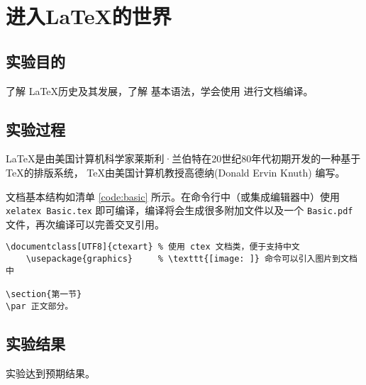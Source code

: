 \section{进入\LaTeX 的世界}

\subsection{实验目的}
\par 了解 \LaTeX 历史及其发展，了解 \LaTeXe 基本语法，学会使用 \XeLaTeX 进行文档编译。

\subsection{实验过程}
\par \LaTeX 是由美国计算机科学家莱斯利·兰伯特在20世纪80年代初期开发的一种基于 \TeX 的排版系统，
\TeX 由美国计算机教授高德纳(Donald Ervin Knuth) 编写。

\par 文档基本结构如清单 \ref{code:basic} 所示。在命令行中（或集成编辑器中）使用
\texttt{xelatex Basic.tex}
即可编译，编译将会生成很多附加文件以及一个 \verb|Basic.pdf| 文件，再次编译可以完善交叉引用。

\begin{code}
\label{code:basic}
\begin{verbatim}
\documentclass[UTF8]{ctexart} % 使用 ctex 文档类，便于支持中文
    \usepackage{graphics}     % \texttt{[image: ]} 命令可以引入图片到文档中

\section{第一节}
\par 正文部分。

\end{verbatim}
\end{code}

\subsection{实验结果}
\par 实验达到预期结果。
